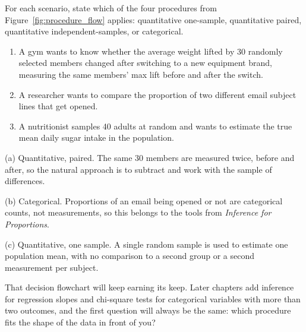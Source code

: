\begin{Exercise}[title={Choosing the Procedure}, label={ex:means-test2-select}]
For each scenario, state which of the four procedures from Figure~\ref{fig:procedure_flow} applies: quantitative one-sample, quantitative paired, quantitative independent-samples, or categorical.
\begin{enumerate}
    \item[(a)] A gym wants to know whether the average weight lifted by 30 randomly selected members changed after switching to a new equipment brand, measuring the same members' max lift before and after the switch.
    \item[(b)] A researcher wants to compare the proportion of two different email subject lines that get opened.
    \item[(c)] A nutritionist samples 40 adults at random and wants to estimate the true mean daily sugar intake in the population.
\end{enumerate}
\end{Exercise}

\begin{Answer}[ref={ex:means-test2-select}]
(a) Quantitative, paired. The same 30 members are measured twice, before and after, so the natural approach is to subtract and work with the sample of differences.

(b) Categorical. Proportions of an email being opened or not are categorical counts, not measurements, so this belongs to the tools from \emph{Inference for Proportions}.

(c) Quantitative, one sample. A single random sample is used to estimate one population mean, with no comparison to a second group or a second measurement per subject.
\end{Answer}

That decision flowchart will keep earning its keep. Later chapters add inference for regression slopes and chi-square tests for categorical variables with more than two outcomes, and the first question will always be the same: which procedure fits the shape of the data in front of you?


 
